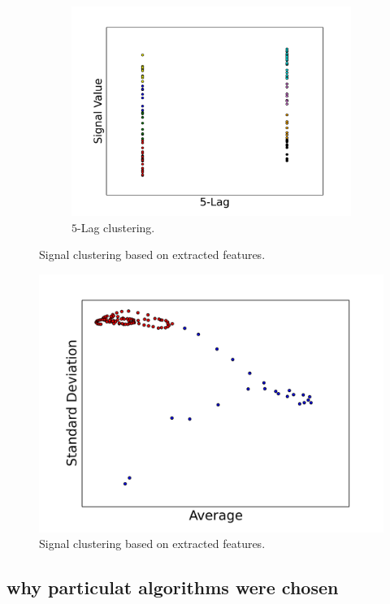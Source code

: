 \documentclass[11pt, letterpaper]{article}            %
\begin{document}
\begin{figure}[htbp]
  \begin{subfigure}[b]{0.5\textwidth}
    \includegraphics[width=\textwidth]{./gfx/f4f5.png}
    \caption{$5$-Lag clustering.\label{fig:Clag}}
  \end{subfigure}
  \caption{Signal clustering based on extracted features.\label{fig:clustering}}
\end{figure}


\begin{figure}[htbp]
  \centering
  \includegraphics[width=.7\textwidth]{./gfx/f1f2.png}
  \caption{Signal clustering based on extracted features.\label{fig:Wclustering}}
\end{figure}


\subsection{why particulat algorithms were chosen}
\end{document}
